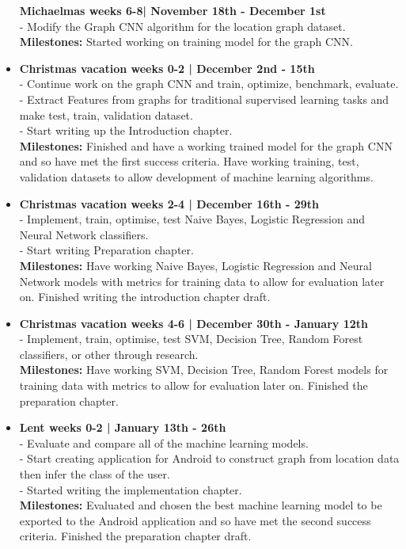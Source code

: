 \documentclass[12pt,a4paper,twoside]{article}
\begin{document}
\begin{itemize}
\textbf{Michaelmas weeks 6-8| November 18th - December 1st}\\
- Modify the Graph CNN algorithm for the location graph dataset.\\
\textbf{Milestones:} Started working on training model for the graph CNN.
\item \textbf{Christmas vacation weeks 0-2 | December 2nd - 15th}\\
- Continue work on the graph CNN and train, optimize, benchmark, evaluate.\\
- Extract Features from graphs for traditional supervised learning tasks and make test, train, validation dataset.\\
- Start writing up the Introduction chapter.\\
\textbf{Milestones: }Finished and have a working trained model for the graph CNN and so have met the first success criteria. Have working training, test, validation datasets to allow development of machine learning algorithms.
\item \textbf{Christmas vacation weeks 2-4 | December 16th - 29th}\\
- Implement, train, optimise, test Naive Bayes, Logistic Regression and Neural Network classifiers.\\
- Start writing Preparation chapter.\\
\textbf{Milestones: }Have working Naive Bayes, Logistic Regression and Neural Network models with metrics for training data to allow for evaluation later on. Finished writing the introduction chapter draft.
\item \textbf{Christmas vacation weeks 4-6 | December 30th - January 12th}\\
- Implement, train, optimise, test SVM, Decision Tree, Random Forest classifiers, or other through research.\\
\textbf{Milestones: }Have working SVM, Decision Tree, Random Forest  models for training data with metrics to allow for evaluation later on. Finished the preparation chapter.
\item \textbf{Lent weeks 0-2 | January 13th - 26th}\\
- Evaluate and compare all of the machine learning models.\\
- Start creating application for Android to construct graph from location data then infer the class of the user. \\
- Started writing the implementation chapter.\\
 \textbf{Milestones: }Evaluated and chosen the best machine learning model to be exported to the Android application and so have met the second success criteria. Finished the preparation chapter draft.

\end{itemize}
\end{document}
